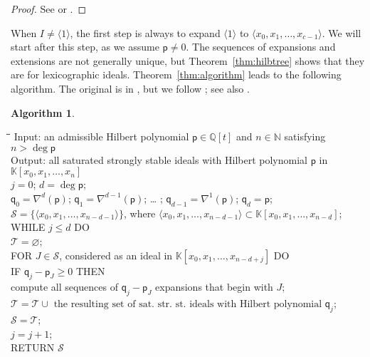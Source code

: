 \documentclass[12pt]{amsart}%
\theoremstyle{definition}%
\newtheorem{algorithm}[theorem]{Algorithm}
\newcommand{\hp}{\mathsf{p}}%
\newcommand{\hq}{\mathsf{q}}%
\newcommand{\kk}{\mathbb{K}}%
\newcommand{\NN}{\mathbb{N}}%
\newcommand{\QQ}{\mathbb{Q}}%
\begin{document}
\begin{proof}
  See \cite[Theorem~3.20]{Moore--2012} or
  \cite[Theorem~4.4]{Moore--Nagel--2014}.
\end{proof}

When $I \neq \langle 1 \rangle$, the first step is always to expand
$\langle 1 \rangle$ to $\langle x_0 , x_1, \ldots, x_{c-1} \rangle$.
We will start after this step, as we assume $\hp \neq 0$.  The
sequences of expansions and extensions are not generally unique, but
Theorem~\ref{thm:hilbtree} shows that they are for lexicographic
ideals.  Theorem~\ref{thm:algorithm} leads to the following algorithm.
The original is in \cite[Appendix~A]{Reeves--1992}, but we follow
\cite{Moore--2012, Moore--Nagel--2014}; see also
\cite[Section~5]{Cioffi--Lella--Marinari--Roggero--2011}.

\begin{algorithm}
  \label{alg:SSS}
  \qquad
  \begin{tabbing}
    \qquad \= \qquad \= \qquad \= \kill
    \textrm{Input:} an admissible Hilbert polynomial $\hp \in \QQ[t]$ and
    $n \in \NN$ satisfying $n > \deg \hp$ \\

  \textrm{Output:} all saturated strongly stable ideals with Hilbert
  polynomial $\hp$ in $\kk[x_0, x_1, \dotsc, x_n]$ \\[0.4em]
    
    $j = 0$; $d = \deg \hp$; \\[0.1em] 

    $\hq_0 = \nabla^d(\hp)$; $\hq_{1} = \nabla^{d-1} (\hp)$; \ldots
    ; $\hq_{d-1} = \nabla^{1} (\hp)$; $\hq_d = \hp$; \\[0.1em]

    $\mathcal{S} = \{ \langle x_0, x_1, \ldots, x_{n-d-1} \rangle \}$,
  where $\langle x_0, x_1, \ldots, x_{n-d-1} \rangle \subset\kk[x_0,
    x_1, \dotsc, x_{n-d}]$; \\[0.2em]

    \textrm{WHILE} $j \le d$ \textrm{DO} \\

    \>  $\mathcal{T} = \varnothing$; \\

    \>  \textrm{FOR} $J \in \mathcal{S}$, considered as an ideal in
    $\kk[x_0, x_1, \dotsc, x_{n-d+j}]$ \textrm{DO} \\

    \> \>    \textrm{IF} $\hq_j - \hp_J \ge 0$ \textrm{THEN} \\

    \> \> \> compute all sequences of $\hq_j - \hp_J$ expansions that
    begin with $J$; \\
    \> \> \> $\mathcal{T} = \mathcal{T} \cup \text{ the resulting set of
      sat.\ str.\ st.\ ideals with Hilbert polynomial } \hq_j$; \\

    \>  $\mathcal{S} = \mathcal{T}$; \\
    \> $j = j+1$; \\

    \textrm{RETURN} $\mathcal{S}$
  \end{tabbing}
\end{algorithm}
\end{document}
